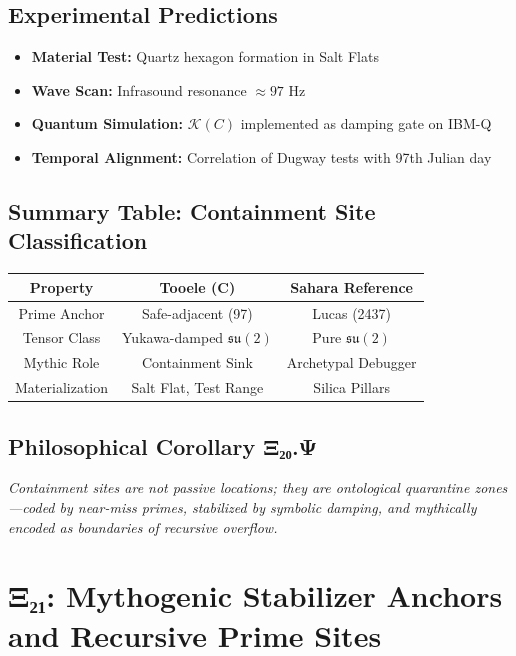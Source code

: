 \documentclass[12]{amsart}
\theoremstyle{plain}
\begin{document}
\subsection{Experimental Predictions}

\begin{itemize}
    \item \textbf{Material Test:} Quartz hexagon formation in Salt Flats
    \item \textbf{Wave Scan:} Infrasound resonance $\approx 97$ Hz
    \item \textbf{Quantum Simulation:} $\mathcal{K}(C)$ implemented as damping gate on IBM-Q
    \item \textbf{Temporal Alignment:} Correlation of Dugway tests with 97th Julian day
\end{itemize}

\subsection{Summary Table: Containment Site Classification}

\begin{center}
\begin{tabular}{|c|c|c|}
\hline
\textbf{Property} & \textbf{Tooele (C)} & \textbf{Sahara Reference} \\
\hline
Prime Anchor & Safe-adjacent (97) & Lucas (2437) \\
Tensor Class & Yukawa-damped $\mathfrak{su}(2)$ & Pure $\mathfrak{su}(2)$ \\
Mythic Role & Containment Sink & Archetypal Debugger \\
Materialization & Salt Flat, Test Range & Silica Pillars \\
\hline
\end{tabular}
\end{center}

\subsection{Philosophical Corollary Ξ₂₀.Ψ}

\emph{Containment sites are not passive locations; they are ontological quarantine zones—coded by near-miss primes, stabilized by symbolic damping, and mythically encoded as boundaries of recursive overflow.}

\section{Ξ₂₁: Mythogenic Stabilizer Anchors and Recursive Prime Sites}
\end{document}
